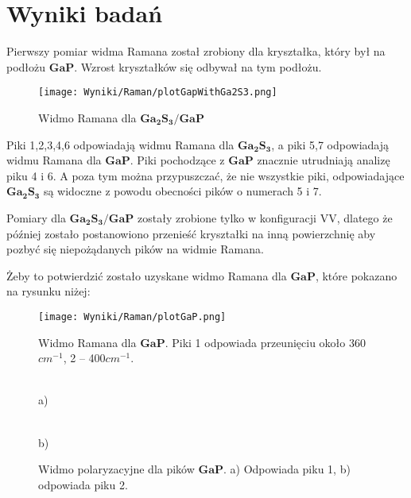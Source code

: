 \newpage

\section{Wyniki badań}

Pierwszy pomiar widma Ramana został zrobiony dla kryształka, który był na podłożu $\mathbf{GaP}$. Wzrost kryształków się odbywał na tym podłożu. 

\begin{figure}[H]
	\begin{center}
		\texttt{[image: Wyniki/Raman/plotGapWithGa2S3.png]}
		\caption{Widmo Ramana dla $\mathbf{Ga_{2}S_{3}/GaP}$}
	\end{center}
\end{figure}

Piki 1,2,3,4,6 odpowiadają widmu Ramana dla $\mathbf{Ga_{2}S_{3}}$, a piki 5,7 odpowiadają widmu Ramana dla $\mathbf{GaP}$. Piki pochodzące z $\mathbf{GaP}$ znacznie utrudniają analizę piku 4 i 6. A poza tym można przypuszczać, że nie wszystkie piki, odpowiadające $\mathbf{Ga_{2}S_{3}}$ są widoczne z powodu obecności pików o numerach 5 i 7. 

Pomiary dla $\mathbf{Ga_{2}S_{3}/GaP}$ zostały zrobione tylko w konfiguracji VV, dlatego że później zostało postanowiono przenieść kryształki na inną powierzchnię aby pozbyć się niepożądanych pików na widmie Ramana. 

\newpage

Żeby to potwierdzić zostało uzyskane widmo Ramana dla $\mathbf{GaP}$, które pokazano na rysunku niżej:

\begin{figure}[H]
	\begin{center}
		\texttt{[image: Wyniki/Raman/plotGaP.png]}
		\caption{Widmo Ramana dla $\mathbf{GaP}$. Piki 1 odpowiada przeunięciu około 360$cm^{-1}$, 2 -- 400$cm^{-1}$.}
	\end{center}
\end{figure}

\begin{figure}[H]
	\begin{minipage}[h]{0.5\linewidth}
		 \\ a) 
	\end{minipage}
	\hfill
	\begin{minipage}[h]{0.5\linewidth}
		 \\b)
	\end{minipage}
	\caption{Widmo polaryzacyjne dla pików $\mathbf{GaP}$. a) Odpowiada piku 1, b) odpowiada piku 2.}
\end{figure}

